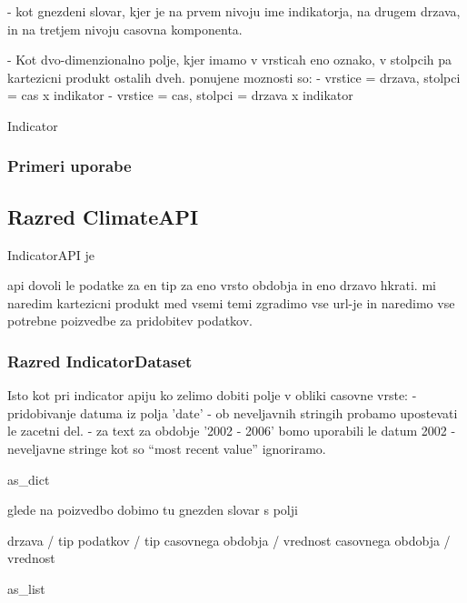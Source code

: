  - kot gnezdeni slovar, kjer je na prvem nivoju ime indikatorja, na drugem
   drzava, in na tretjem nivoju casovna komponenta.

 - Kot dvo-dimenzionalno polje, kjer imamo v vrsticah eno oznako, v stolpcih
   pa kartezicni produkt ostalih dveh. ponujene moznosti so:
   - vrstice = drzava, stolpci = cas x indikator
   - vrstice = cas, stolpci = drzava x indikator


Indicator



% 
% 
% 
% 
% 
% 


\subsubsection{Primeri uporabe}





\subsection{Razred ClimateAPI}

IndicatorAPI je 


api dovoli le podatke za en tip za eno vrsto obdobja in eno drzavo hkrati.
mi naredim kartezicni produkt med vsemi temi zgradimo vse url-je in naredimo
vse potrebne poizvedbe za pridobitev podatkov.



\subsubsection{Razred IndicatorDataset}

Isto kot pri indicator apiju
ko zelimo dobiti polje v obliki casovne vrste:
 - pridobivanje datuma iz polja 'date'
   - ob neveljavnih stringih probamo upostevati le zacetni del.
     - za text za  obdobje  '2002 - 2006' bomo uporabili le datum 2002 
   - neveljavne stringe kot so ``most recent value'' ignoriramo.




as\_dict 

glede na poizvedbo dobimo tu gnezden slovar s polji

drzava / tip podatkov / tip casovnega obdobja / vrednost casovnega obdobja / vrednost

as\_list

